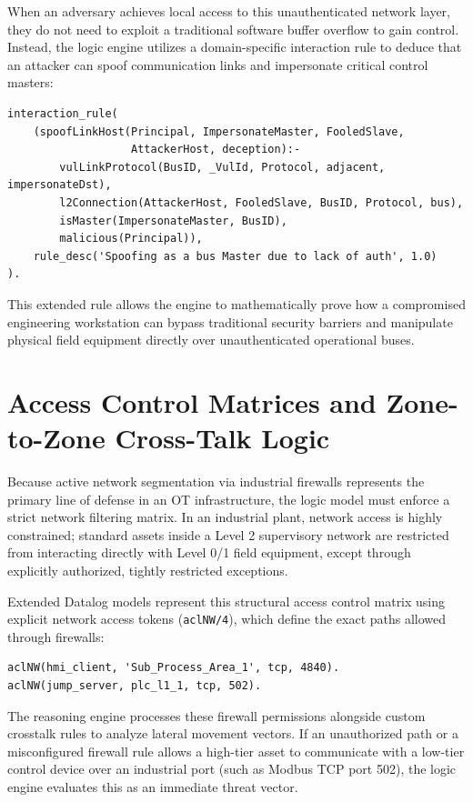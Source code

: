 \documentclass[target=mst,aauheader=aics,style=]{thud}
\begin{document}
When an adversary achieves local access to this unauthenticated network layer, they do not need to exploit a traditional software buffer overflow to gain control. Instead, the logic engine utilizes a domain-specific interaction rule to deduce that an attacker can spoof communication links and impersonate critical control masters:
\begin{verbatim}
interaction_rule(
    (spoofLinkHost(Principal, ImpersonateMaster, FooledSlave, 
                   AttackerHost, deception):-
        vulLinkProtocol(BusID, _VulId, Protocol, adjacent, impersonateDst),
        l2Connection(AttackerHost, FooledSlave, BusID, Protocol, bus),
        isMaster(ImpersonateMaster, BusID),
        malicious(Principal)),
    rule_desc('Spoofing as a bus Master due to lack of auth', 1.0)
).
\end{verbatim}
This extended rule allows the engine to mathematically prove how a compromised engineering workstation can bypass traditional security barriers and manipulate physical field equipment directly over unauthenticated operational buses.

\section{Access Control Matrices and Zone-to-Zone Cross-Talk Logic}
Because active network segmentation via industrial firewalls represents the primary line of defense in an OT infrastructure, the logic model must enforce a strict network filtering matrix. In an industrial plant, network access is highly constrained; standard assets inside a Level 2 supervisory network are restricted from interacting directly with Level 0/1 field equipment, except through explicitly authorized, tightly restricted exceptions.

Extended Datalog models represent this structural access control matrix using explicit network access tokens (\texttt{aclNW/4}), which define the exact paths allowed through firewalls:
\begin{verbatim}
aclNW(hmi_client, 'Sub_Process_Area_1', tcp, 4840).
aclNW(jump_server, plc_l1_1, tcp, 502).
\end{verbatim}

The reasoning engine processes these firewall permissions alongside custom crosstalk rules to analyze lateral movement vectors. If an unauthorized path or a misconfigured firewall rule allows a high-tier asset to communicate with a low-tier control device over an industrial port (such as Modbus TCP port 502), the logic engine evaluates this as an immediate threat vector.
\end{document}
